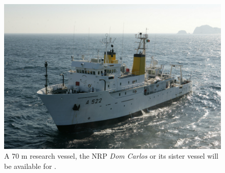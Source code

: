 \begin{figure}
  \centering
  \includegraphics[scale=1.75]{fig/dom-carlos.jpg}
  \caption{A 70 m \inst research vessel, the NRP \emph{Dom Carlos} or
    its sister vessel will be available for \proje.}
 \label{fig:vessel}
\end{figure}


